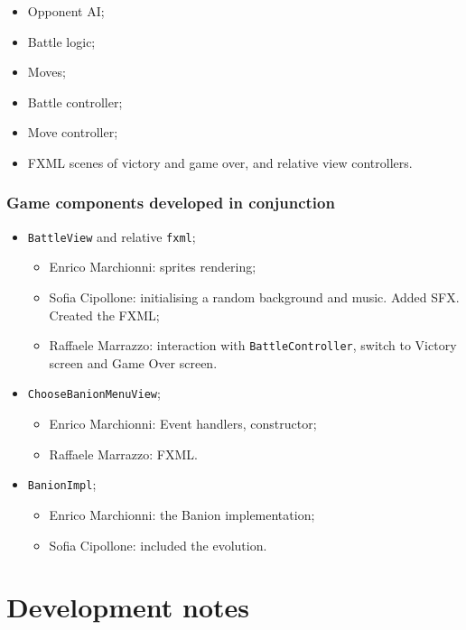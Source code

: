 \documentclass[12pt, a4paper]{report}
\theoremstyle{definition}
\begin{document}
    \begin{itemize}
        \item Opponent AI;
        \item Battle logic;
        \item Moves;
        \item Battle controller;
        \item Move controller;
        \item FXML scenes of victory and game over, and relative view controllers.
    \end{itemize}

    \subsubsection*{Game components developed in conjunction}

    \begin{itemize}
        \item \verb|BattleView| and relative \verb|fxml|;
        \begin{itemize}
            \item Enrico Marchionni: sprites rendering;
            \item Sofia Cipollone: initialising a random background and music. Added SFX. Created the FXML;
            \item Raffaele Marrazzo: interaction with \verb|BattleController|, switch to Victory screen and Game Over screen.
        \end{itemize}
        \item \verb|ChooseBanionMenuView|;
        \begin{itemize}
            \item Enrico Marchionni: Event handlers, constructor;
            \item Raffaele Marrazzo: FXML.
        \end{itemize}
        \item \verb|BanionImpl|;
        \begin{itemize}
            \item Enrico Marchionni: the Banion implementation;
            \item Sofia Cipollone: included the evolution\label{multimap}.
        \end{itemize}
    \end{itemize}

\section{Development notes}
\end{document}
